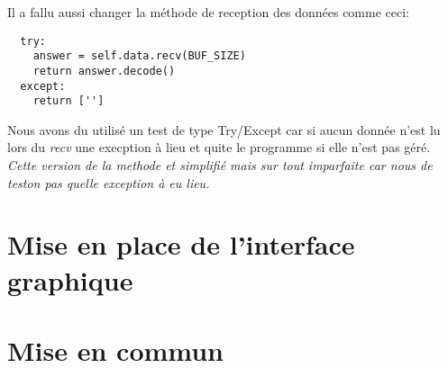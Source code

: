 \documentclass[12pt]{report}
\begin{document}
Il a fallu aussi changer la méthode de reception des données comme ceci:
\begin{verbatim}
  try:
    answer = self.data.recv(BUF_SIZE)
    return answer.decode()
  except:
    return ['']
\end{verbatim}

Nous avons du utilisé un test de type Try/Except car si aucun donnée n'est lu
lors du \textit{recv} une execption à lieu et quite le programme si elle
n'est pas géré.
\textit{Cette version de la methode et simplifié mais sur tout imparfaite
  car nous de teston pas quelle exception à eu lieu.}

\chapter{Mise en place de l'interface graphique}

\chapter{Mise en commun}
\end{document}
